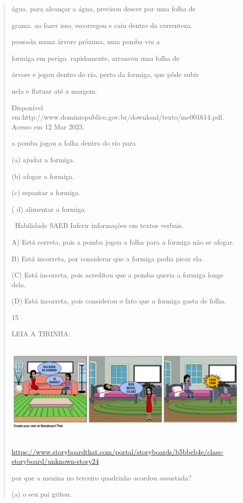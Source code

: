 \begin{verse}
{{{{{{{{{{{{{{{{{{{{água. para alcançar a água, precisou descer por uma folha de

grama. ao fazer isso, escorregou e caiu dentro da correnteza.

pousada numa árvore próxima, uma pomba viu a

formiga em perigo. rapidamente, arrancou uma folha de

árvore e jogou dentro do rio, perto da formiga, que pôde subir

nela e flutuar até a margem.

Disponível
em:http://www.dominiopublico.gov.br/download/texto/me001614.pdf. Acesso
em 12 Mar 2023.

a pomba jogou a folha dentro do rio para

(a) ajudar a formiga.

(b) afogar a formiga.

(c) espantar a formiga.

( d) alimentar a formiga.

~Habilidade SAEB Inferir informações em textos verbais.

A) Está correta, pois a pomba jogou a folha para a formiga não se
afogar.

B) Está incorreta, por considerar que a formiga podia picar ela.

(C) Está incorreta, pois acreditou que a pomba queria a formiga longe
dela.

(D) Está incorreta, pois considerou o fato que a formiga gosta de folha.

\num{15}

LEIA A TIRINHA:

\includegraphics[width=5.90556in,height=1.95694in]{media/image172.png}

\url{https://www.storyboardthat.com/portal/storyboards/b5bbeb4e/class-storyboard/unknown-story24}

por que a menina no terceiro quadrinho acordou assustada?

(a) o seu pai gritou.

}}}}}}}}}}}}}}}}}}}}
\end{verse}
